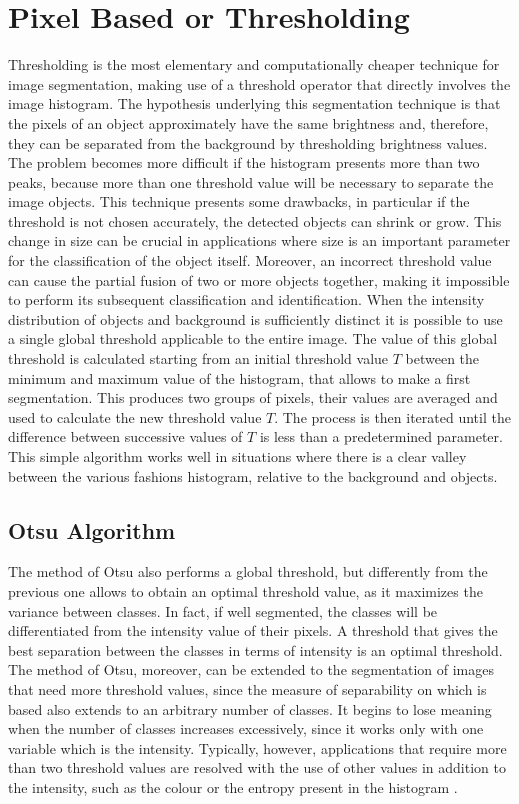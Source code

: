 \documentclass[final,a4paper,12pt,english]{UnicaPhdThesis3}
\begin{document}
\section{Pixel Based or Thresholding} %
Thresholding is the most elementary and computationally cheaper technique for image segmentation, making use of a threshold operator that directly involves the image histogram. The hypothesis underlying this segmentation technique is that the pixels of an object approximately have the same brightness and, therefore, they can be separated from the background by thresholding brightness values. The problem becomes more difficult if the histogram presents more than two peaks, because more than one threshold value will be necessary to separate the image objects. This technique presents some drawbacks, in particular if the threshold is not chosen accurately, the detected objects can shrink or grow. This change in size can be crucial in applications where size is an important parameter for the classification of the object itself. Moreover, an incorrect threshold value can cause the partial fusion of two or more objects together, making it impossible to perform its subsequent classification and identification. When the intensity distribution of objects and background is sufficiently distinct it is possible to use a single global threshold \cite{Gonz, GonzMAT} applicable to the entire image. The value of this global threshold is calculated starting from an initial threshold value $T$ between the minimum and maximum value of the histogram, that allows to make a first segmentation. This produces two groups of pixels, their values are averaged and used to calculate the new threshold value $T$. The process is then iterated until the difference between successive values of $T$ is less than a predetermined parameter. This simple algorithm works well in situations where there is a clear valley between the various fashions histogram, relative to the background and objects.

\subsection{Otsu Algorithm} \label{Otsu} %
The method of Otsu \cite{Otsu} also performs a global threshold, but differently from the previous one allows to obtain an optimal threshold value, as it maximizes the variance between classes. In fact, if well segmented, the classes will be differentiated from the intensity value of their pixels. A threshold that gives the best separation between the classes in terms of intensity is an optimal threshold. The method of Otsu, moreover, can be extended to the segmentation of images that need more threshold values, since the measure of separability on which is based also extends to an arbitrary number of classes. It begins to lose meaning when the number of classes increases excessively, since it works only with one variable which is the intensity. Typically, however, applications that require more than two threshold values are resolved with the use of other values in addition to the intensity, such as the colour or the entropy present in the histogram \cite{Kapur}.
\end{document}
